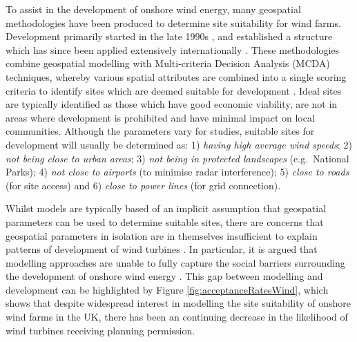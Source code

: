 \documentclass[a4paper,]{article}
\theoremstyle{definition}
\theoremstyle{definition}
\theoremstyle{definition}
\theoremstyle{remark}
\begin{document}
To assist in the development of onshore wind energy, many geospatial methodologies have been produced to determine site suitability for wind farms. Development primarily started in the late 1990s \citep{Voivontas1998, Baban2001}, and established a structure which has since been applied extensively internationally \citep{Hansen2005, Yue2006, Lee2009, Janke2010, SQWEnergy2010, Aydin2010, VanHaaren2011, Sliz-Szkliniarz2011, Gass2013, Neufville2013, Miller2014, Wang2014, Watson2015, Noorollahi2015, Atici2015, Baseer2017, Gigovic2017, Mentis2017, Manomaiphiboon2017, Liu2017, Kazak2017}. These methodologies combine geospatial modelling with Multi-criteria Decision Analysis (MCDA) techniques, whereby various spatial attributes are combined into a single scoring criteria to identify sites which are deemed suitable for development \citep{Malczewski2004}. Ideal sites are typically identified as those which have good economic viability, are not in areas where development is prohibited and have minimal impact on local communities. Although the parameters vary for studies, suitable sites for development will usually be determined as: 1) \emph{having high average wind speeds}; 2) \emph{not being close to urban areas}; 3) \emph{not being in protected landscapes} (e.g.~National Parks); 4) \emph{not close to airports} (to minimise radar interference); 5) \emph{close to roads} (for site access) and 6) \emph{close to power lines} (for grid connection).

Whilst models are typically based of an implicit assumption that geospatial parameters can be used to determine suitable sites, there are concerns that geospatial parameters in isolation are in themselves insufficient to explain patterns of development of wind turbines \citep{VanderHorst2010, Toke2005}. In particular, it is argued that modelling approaches are unable to fully capture the social barriers surrounding the development of onshore wind energy \citep{Langer2016}. This gap between modelling and development can be highlighted by Figure \ref{fig:acceptanceRatesWind}, which shows that despite widespread interest in modelling the site suitability of onshore wind farms in the UK, there has been an continuing decrease in the likelihood of wind turbines receiving planning permission.
\end{document}
